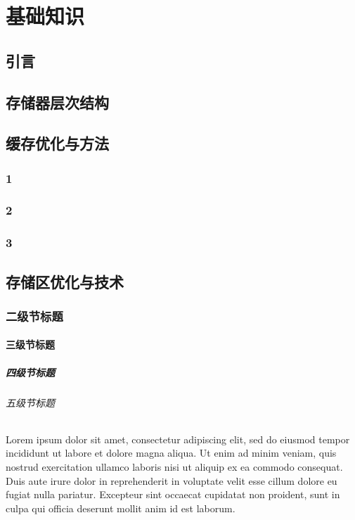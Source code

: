 
\chapter{基础知识}

\section{引言}
\section{存储器层次结构}
\section{缓存优化与方法}

\subsection{1}
\subsection{2}
\subsection{3}
\section{存储区优化与技术}

\subsection{二级节标题}

\subsubsection{三级节标题}

\paragraph{四级节标题}

\subparagraph{五级节标题}

Lorem ipsum dolor sit amet, consectetur adipiscing elit, sed do eiusmod tempor
incididunt ut labore et dolore magna aliqua.
Ut enim ad minim veniam, quis nostrud exercitation ullamco laboris nisi ut
aliquip ex ea commodo consequat.
Duis aute irure dolor in reprehenderit in voluptate velit esse cillum dolore eu
fugiat nulla pariatur.
Excepteur sint occaecat cupidatat non proident, sunt in culpa qui officia
deserunt mollit anim id est laborum.



